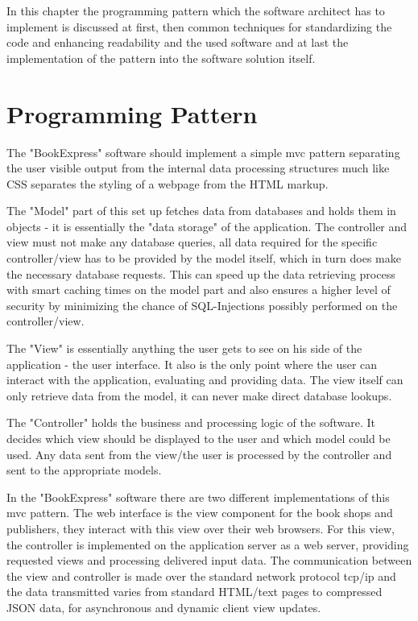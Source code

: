 \documentclass[11pt,a4paper,oneside,svgnames]{report}
\begin{document}
In this chapter the programming pattern which the software architect has to implement is discussed at first, then common techniques for standardizing the code and enhancing readability and the used software and at last the implementation of the pattern into the software solution itself.

\section{Programming Pattern}
\label{sec:mvc-pattern}
The "BookExpress" software should implement a simple \gls{mvc} pattern separating the user visible output from the internal data processing structures much like CSS separates the styling of a webpage from the HTML markup.

The "Model" part of this set up fetches data from databases and holds them in objects - it is essentially the "data storage" of the application. The controller and view must not make any database queries, all data required for the specific controller/view has to be provided by the model itself, which in turn does make the necessary database requests. This can speed up the data retrieving process with smart caching times on the model part and also ensures a higher level of security by minimizing the chance of SQL-Injections possibly performed on the controller/view.

The "View" is essentially anything the user gets to see on his side of the application - the user interface. It also is the only point where the user can interact with the application, evaluating and providing data. The view itself can only retrieve data from the model, it can never make direct database lookups.

The "Controller" holds the business and processing logic of the software. It decides which view should be displayed to the user and which model could be used. Any data sent from the view/the user is processed by the controller and sent to the appropriate models.

In the "BookExpress" software there are two different implementations of this \gls{mvc} pattern. The web interface is the view component for the book shops and publishers, they interact with this view over their web browsers.
For this view, the controller is implemented on the application server as a web server, providing requested views and processing delivered input data. The communication between the view and controller is made over the standard network protocol tcp/ip and the data transmitted varies from standard HTML/text pages to compressed JSON data, for asynchronous and dynamic client view updates.
\end{document}
